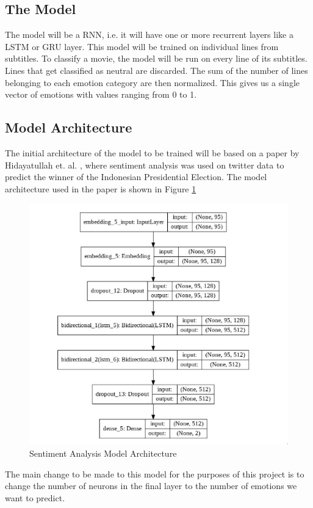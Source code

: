 \subsection{The Model}
The model will be a RNN, i.e. it will have one or more recurrent layers like a LSTM or GRU layer. This model will be trained on individual lines from subtitles. To classify a movie, the model will be run on every line of its subtitles. Lines that get classified as neutral are discarded. The sum of the number of lines belonging to each emotion category are then normalized. This gives us a single vector of emotions with values ranging from 0 to 1.
\subsection{Model Architecture}
The initial architecture of the model to be trained will be based on a paper by Hidayatullah et. al. \cite{rnn-sentiment}, where sentiment analysis was used on twitter data to predict the winner of the Indonesian Presidential Election. The model architecture used in the paper is shown in Figure \ref{fig: movieModelArch}


\begin{figure}[H]
\centering
\includegraphics[width=\textwidth]{imgs/movieModelArch.png}
\caption{Sentiment Analysis Model Architecture}
\label{fig: movieModelArch}
\end{figure}
The main change to be made to this model for the purposes of this project is to change the number of neurons in the final layer to the number of emotions we want to predict. 
